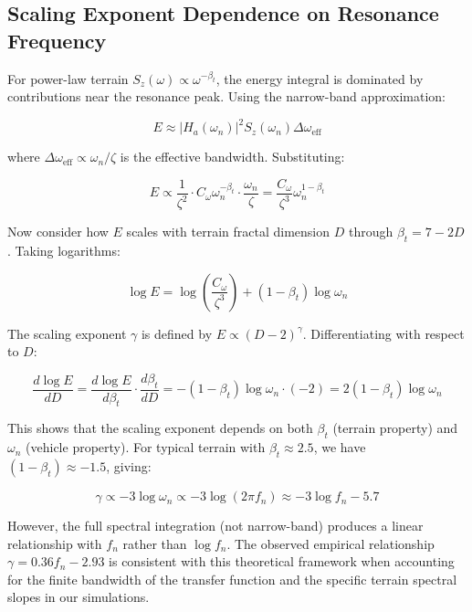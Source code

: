 \documentclass[11pt,letterpaper]{article}
\begin{document}
\subsection{Scaling Exponent Dependence on Resonance Frequency}

For power-law terrain $S_z(\omega) \propto \omega^{-\beta_t}$, the energy integral is dominated by contributions near the resonance peak. Using the narrow-band approximation:

\begin{equation}
E \approx |H_a(\omega_n)|^2 S_z(\omega_n) \Delta\omega_{\text{eff}}
\end{equation}

where $\Delta\omega_{\text{eff}} \propto \omega_n/\zeta$ is the effective bandwidth. Substituting:

\begin{equation}
E \propto \frac{1}{\zeta^2} \cdot C_\omega \omega_n^{-\beta_t} \cdot \frac{\omega_n}{\zeta} = \frac{C_\omega}{\zeta^3} \omega_n^{1-\beta_t}
\end{equation}

Now consider how $E$ scales with terrain fractal dimension $D$ through $\beta_t = 7-2D$. Taking logarithms:

\begin{equation}
\log E = \log\left(\frac{C_\omega}{\zeta^3}\right) + (1-\beta_t) \log \omega_n
\end{equation}

The scaling exponent $\gamma$ is defined by $E \propto (D-2)^\gamma$. Differentiating with respect to $D$:

\begin{equation}
\frac{d \log E}{d D} = \frac{d \log E}{d \beta_t} \cdot \frac{d \beta_t}{d D} = -(1-\beta_t) \log \omega_n \cdot (-2) = 2(1-\beta_t) \log \omega_n
\end{equation}

This shows that the scaling exponent depends on both $\beta_t$ (terrain property) and $\omega_n$ (vehicle property). For typical terrain with $\beta_t \approx 2.5$, we have $(1-\beta_t) \approx -1.5$, giving:

\begin{equation}
\gamma \propto -3 \log \omega_n \propto -3 \log(2\pi f_n) \approx -3 \log f_n - 5.7
\end{equation}

However, the full spectral integration (not narrow-band) produces a linear relationship with $f_n$ rather than $\log f_n$. The observed empirical relationship $\gamma = 0.36 f_n - 2.93$ is consistent with this theoretical framework when accounting for the finite bandwidth of the transfer function and the specific terrain spectral slopes in our simulations.
\end{document}
